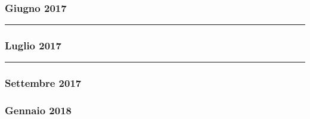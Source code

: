 \begin{mdframed}
	
\end{mdframed}


\subsubsection*{Giugno 2017}

\begin{mdframed}
	

	\noindent\hfil\rule{\textwidth}{.4pt}\hfil

	
\end{mdframed}


\subsubsection*{Luglio 2017}

\begin{mdframed}
	

	\noindent\hfil\rule{\textwidth}{.4pt}\hfil

	
\end{mdframed}


\subsubsection*{Settembre 2017}

\begin{mdframed}
	
\end{mdframed}


\newpage

\subsubsection*{Gennaio 2018}

\begin{mdframed}
	\begin{mdframed}
		
	\end{mdframed}

	
\end{mdframed}

